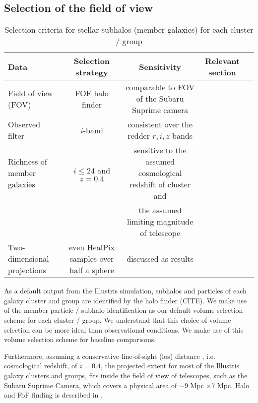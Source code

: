 \subsection{Selection of the field of view}
\label{sec:FOV}

\begin{table*}
\begin{center}
\begin{minipage}{180mm} 
	\caption{ Selection criteria for stellar subhalos (member galaxies) for each
		cluster / group 
\label{tab:member_galaxy_selections}} 
	\begin{tabular}{@{}lcccc@{}}
\hline 
Data &  Selection strategy  & Sensitivity & Relevant section  \\ \hline
Field of view (FOV) & FOF halo finder& comparable to FOV of the Subaru
Suprime camera &   \\ 
Observed filter & $i$-band & consistent over the redder $r, i, z$ bands &   \\ 
Richness of member galaxies & $i \leq 24$ and $z = 0.4$  & sensitive to
the assumed cosmological redshift of cluster and &    \\ 
& & the assumed limiting magnitude of telescope &   \\
Two-dimensional projections & even HealPix samples over half a sphere &
discussed as results  & \\  
\hline
\end{tabular} 
\label{tab:selection_criteria} 
\footnotesize{
}
\end{minipage}
\end{center} 
\end{table*}

As a default output from the Illustris simulation, subhalos and particles of
each galaxy cluster and group are identified by the halo finder
(CITE). We make use of the member particle / subhalo identification as our
default volume selection scheme for each cluster / group.
We understand that this choice of volume selection can be more ideal than
observational conditions. We make use of this volume selection scheme
for baseline comparisons. 

Furthermore, assuming a conservative line-of-sight (los) distance 
, i.e. cosmological redshift, of $z = 0.4$, 
the projected extent for most of the Illustris galaxy clusters and groups, 
fits inside the field of view of telescopes, such as the Subaru Suprime Camera,
which covers a physical area of $\sim 9$ Mpc $\times 7$ Mpc. 
Halo and FoF finding is described in \citep{Vogelsberger2014}.

